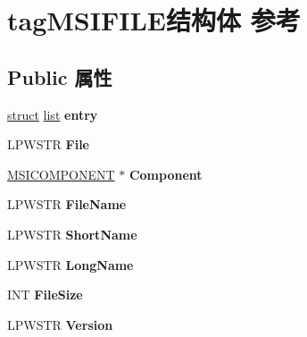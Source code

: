 \hypertarget{structtag_m_s_i_f_i_l_e}{}\section{tag\+M\+S\+I\+F\+I\+L\+E结构体 参考}
\label{structtag_m_s_i_f_i_l_e}
\subsection*{Public 属性}
\begin{DoxyCompactItemize}
\item 
\mbox{\label{structtag_m_s_i_f_i_l_e_aea48c37384430ba2f270c6c755c32a9f}} 
\hyperlink{interfacestruct}{struct} \hyperlink{classlist}{list} {\bfseries entry}
\item 
\mbox{\label{structtag_m_s_i_f_i_l_e_a557c297e60bbad97a76f19947d95fa0a}} 
L\+P\+W\+S\+TR {\bfseries File}
\item 
\mbox{\label{structtag_m_s_i_f_i_l_e_a663d3b96aef2dd902840383ac3bff589}} 
\hyperlink{structtag_m_s_i_c_o_m_p_o_n_e_n_t}{M\+S\+I\+C\+O\+M\+P\+O\+N\+E\+NT} $\ast$ {\bfseries Component}
\item 
\mbox{\label{structtag_m_s_i_f_i_l_e_ac3a316eb0b3f81f4ae6ffff79516b67a}} 
L\+P\+W\+S\+TR {\bfseries File\+Name}
\item 
\mbox{\label{structtag_m_s_i_f_i_l_e_ae7fb2db9261f8f918c7c3f4ff15fa3dc}} 
L\+P\+W\+S\+TR {\bfseries Short\+Name}
\item 
\mbox{\label{structtag_m_s_i_f_i_l_e_af21673b065a580b3474209a124d1e52c}} 
L\+P\+W\+S\+TR {\bfseries Long\+Name}
\item 
\mbox{\label{structtag_m_s_i_f_i_l_e_ae60ca63ed6a544110cf3890cbbfb826b}} 
I\+NT {\bfseries File\+Size}
\item 
\mbox{\label{structtag_m_s_i_f_i_l_e_adaf41d0c098983f0202d3135f374bd66}} 
L\+P\+W\+S\+TR {\bfseries Version}
\item 
\mbox{\label{structtag_m_s_i_f_i_l_e_aa48f07dc1853e1b8ff31bc892bb6dda8}} 

\end{DoxyCompactItemize}

